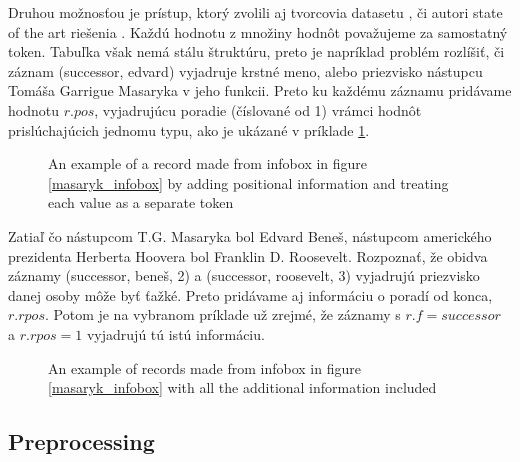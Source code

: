 Druhou možnosťou je prístup, ktorý zvolili aj tvorcovia datasetu \citep{lebret2016neural}, či autori state of the art riešenia \citep{liu2017tabletotext}. Každú hodnotu z množiny hodnôt považujeme za samostatný token. Tabuľka však nemá stálu štruktúru, preto je napríklad problém rozlíšiť, či záznam (successor, edvard) vyjadruje krstné meno, alebo priezvisko nástupcu Tomáša Garrigue Masaryka v jeho funkcii. Preto ku každému záznamu pridávame hodnotu $r.pos$, vyjadrujúcu poradie (číslované od 1) vrámci hodnôt prislúchajúcich jednomu typu, ako je ukázané v príklade \ref{multitokenref}.

\begin{figure}[!h]
\centering
\usetikzlibrary{shapes.multipart}
\caption{An example of a record made from infobox in figure \ref{masaryk_infobox} by adding positional information and treating each value as a separate token} \label{multitokenref}
\end{figure}

 Zatiaľ čo nástupcom T.G. Masaryka bol Edvard Beneš, nástupcom amerického prezidenta Herberta Hoovera bol Franklin D. Roosevelt. Rozpoznať, že obidva záznamy (successor, beneš, 2) a (successor, roosevelt, 3) vyjadrujú priezvisko danej osoby môže byť ťažké. Preto pridávame aj informáciu o poradí od konca, $r.rpos$. Potom je na vybranom príklade už zrejmé, že záznamy s $r.f = successor$ a $r.rpos = 1$ vyjadrujú tú istú informáciu.

\begin{figure}[!h]
\centering
\usetikzlibrary{shapes.multipart}
\caption{An example of records made from infobox in figure \ref{masaryk_infobox} with all the additional information included} \label{multitokenfinal}
\end{figure}

\subsection{Preprocessing}

